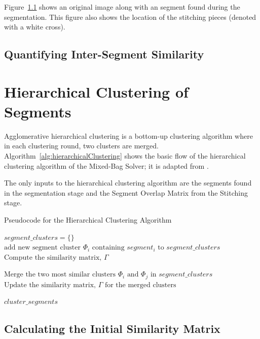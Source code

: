 Figure~\ref{} shows an original image along with an segment found during the segmentation.  This figure also shows the location of the stitching pieces (denoted with a white cross).  

\subsection{Quantifying Inter-Segment Similarity}



\section{Hierarchical Clustering of Segments}

Agglomerative hierarchical clustering is a bottom-up clustering algorithm where in each clustering round, two clusters are merged.  Algorithm~\ref{alg:hierarchicalClustering} shows the basic flow of the hierarchical clustering algorithm of the Mixed-Bag Solver; it is adapted from \cite{tanIntroToDataMining}.  

The only inputs to the hierarchical clustering algorithm are the segments found in the segmentation stage and the Segment Overlap Matrix from the Stitching stage.

\begin{algorithm}
\caption{Pseudocode for the Hierarchical Clustering Algorithm}\label{alg:hierarchicalClustering}
\begin{algorithmic}[1]
	\State $\textit{segment\_clusters} = \{ \}$	
		\State $\text{add new segment cluster } \Phi_i \text{ containing } segment_i \text{ to } \textit{segment\_clusters}$
	\EndFor
    \State $\text{Compute the similarity matrix, } \Gamma$
\item[]
    	\State $\text{Merge the two most similar clusters } \Phi_i \text{ and } \Phi_j \text{ in } \textit{segment\_clusters}$
    	\State $\text{Update the similarity matrix, } \Gamma \text{ for the merged clusters}$
	\EndWhile
\item[]
    \State \Return $\textit{cluster\_segments}$
\EndFunction
\end{algorithmic}
\end{algorithm}

\subsection{Calculating the Initial Similarity Matrix}

